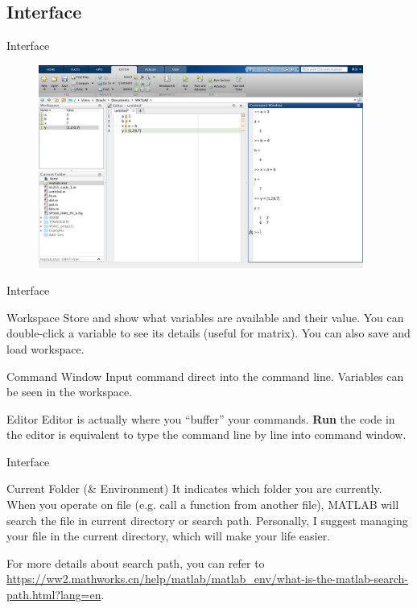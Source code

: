 \documentclass{beamer}
\begin{document}
\subsection{Interface}
\begin{frame}{Interface}
\begin{figure}[htbp]
\centering
\includegraphics[width=0.95\textwidth]{window.png}
\end{figure}
\end{frame}

\begin{frame}{Interface}
\begin{block}{Workspace}
Store and show what variables are available and their value. You can double-click a variable to see its details (useful for matrix). You can also save and load workspace.
\end{block}
\begin{block}{Command Window}
Input command direct into the command line. Variables can be seen in the workspace.
\end{block}
\begin{block}{Editor}
Editor is actually where you ``buffer'' your commands. \textbf{Run} the code in the editor is equivalent to type the command line by line into command window.
\end{block}
\end{frame}


\begin{frame}{Interface}
\begin{block}{Current Folder (\& Environment)}
It indicates which folder you are currently. When you operate on file (e.g. call a function from another file), MATLAB will search the file in current directory or search path. Personally, I suggest managing your file in the current directory, which will make your life easier.

For more details about search path, you can refer to \url{https://ww2.mathworks.cn/help/matlab/matlab_env/what-is-the-matlab-search-path.html?lang=en}.
\end{block}
\end{frame}
\end{document}
